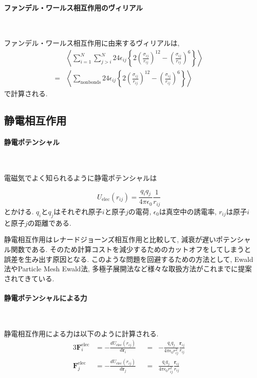 \paragraph{ファンデル・ワールス相互作用のヴィリアル} \

ファンデル・ワールス相互作用に由来するヴィリアルは, 
\begin{align}
 &\left\langle
  \sum_{i=1}^{N} \sum_{j > i}^{N}
  24 \epsilon_{ij}
  \left\{
        2 \left( \frac{\sigma_{ij}}{r_{ij}} \right)^{12}
        - \left( \frac{\sigma_{ij}}{r_{ij}} \right)^{6}
  \right\}
 \right\rangle
 \\
 =
  &\left\langle
   \sum_{\mathrm{nonbonds}}
   24 \epsilon_{ij}
   \left\{
           2\left( \frac{\sigma_{ij}}{r_{ij}} \right)^{12}
          - \left( \frac{\sigma_{ij}}{r_{ij}} \right)^{6}
   \right\}
   \right\rangle
 \label{eq:BioModel33}
\end{align}
で計算される. 

\clearpage
\subsection{静電相互作用}
\paragraph{静電ポテンシャル} \

電磁気でよく知られるように静電ポテンシャルは

\begin{equation}
U_{\mathrm{elec}}(r_{ij}) = \frac{q_{i}q_{j}}{4 \pi \epsilon_{0}}
                            \frac{1}{r_{ij}}
\end{equation}
とかける.
$q_{i}$と$q_{j}$はそれぞれ原子$i$と原子$j$の電荷, $\epsilon_{0}$は真空中の誘電率, 
$r_{ij}$は原子$i$と原子$j$の距離である.

静電相互作用はレナードジョーンズ相互作用と比較して, 減衰が遅いポテンシャル関数である.
そのため計算コストを減少するためのカットオフをしてしまうと誤差を生み出す原因となる.
このような問題を回避するための方法として, Ewald法やParticle Mesh Ewald法,
多極子展開法など様々な取扱方法がこれまでに提案されてきている\cite{2014Cisneros}.

\paragraph{静電ポテンシャルによる力} \

静電相互作用による力は以下のように計算される.
\begin{alignat}{3}
   \bm{F}_{i}^{\mathrm{elec}}
 &=
   -\frac{d U_{\mathrm{elec}}(r_{ij})}{d \bm{r}_{i}}
&&=&
   -\frac{q_{i}q_{j}}{4 \pi \epsilon_{0} r_{ij}^{2}}
    \frac{\bm{r}_{ij}}{r_{ij}}
 \\
    \bm{F}_{j}^{\mathrm{elec}}
 &=
   -\frac{d U_{\mathrm{elec}}(r_{ij})}{d \bm{r}_{j}}
&&=&
    \frac{q_{i}q_{j}}{4 \pi \epsilon_{0} r_{ij}^{2}}
    \frac{\bm{r}_{ij}}{r_{ij}}
 \\
\end{alignat}

